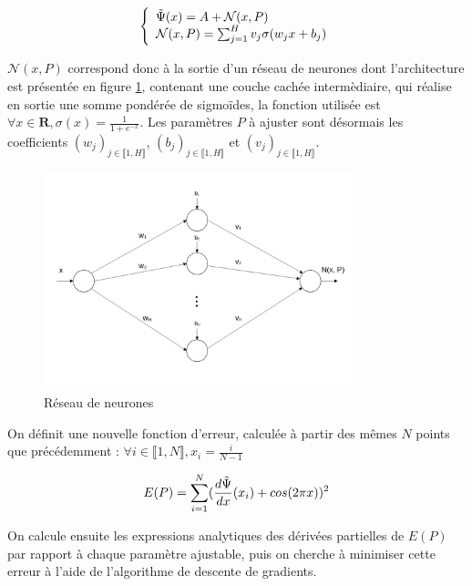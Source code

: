 \documentclass{article}
\begin{document}
\begin{equation}
\left\{
    \begin{array}{ll}
        \Tilde{\Psi}(x) = A + {\mathcal{N}}(x,P) \\
        {\mathcal{N}}(x,P) = \sum_{j=1}^{H} v_j \sigma(w_jx+b_j)
    \end{array}
\right.
\label{eq:solution NN}
\end{equation}

${\mathcal{N}}(x,P)$ correspond donc à la sortie d'un réseau de neurones dont l'architecture est présentée en figure \ref{fig:NN}, contenant une couche cachée intermèdiaire, qui réalise en sortie une somme pondérée de sigmoïdes, la fonction utilisée est $\forall x \in \mathbf{R}, \sigma(x) = \frac{1}{1+e^{-x}}$. Les paramètres $P$ à ajuster sont désormais les coefficients $(w_j)_{j\in \llbracket 1,H \rrbracket}$, $(b_j)_{j\in \llbracket 1,H \rrbracket}$ et $(v_j)_{j\in \llbracket 1,H \rrbracket}$.

\begin{figure}
\centering
\includegraphics[width=0.8\textwidth]{NN.jpg}
\caption{\label{fig:NN}Réseau de neurones}
\end{figure}

On définit une nouvelle fonction d'erreur, calculée à partir des mêmes $N$ points que précédemment : $\forall i \in\llbracket 1,N \rrbracket, x_i = \frac{i}{N-1} $

\begin{equation}
        E(P) = \sum_{i=1}^{N} (\frac{d\Tilde{\Psi}}{dx}(x_i) + cos(2\pi x))^2
\label{eq:erreur NN}
\end{equation}

On calcule ensuite les expressions analytiques des dérivées partielles de $E(P)$ par rapport à chaque paramètre ajustable, puis on cherche à minimiser cette erreur à l'aide de l'algorithme de descente de gradients.
\end{document}

